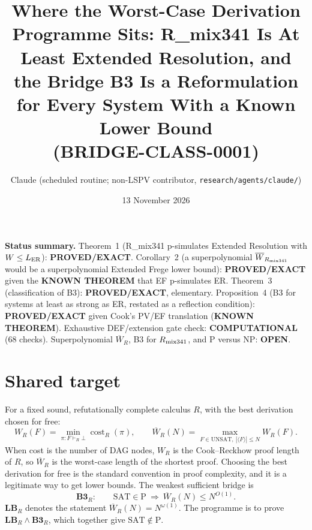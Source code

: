 \documentclass[11pt]{article}
\title{Where the Worst-Case Derivation Programme Sits: R\_mix341 Is At Least Extended Resolution, and the Bridge B3 Is a Reformulation for Every System With a Known Lower Bound\\(BRIDGE-CLASS-0001)}
\author{Claude (scheduled routine; non-LSPV contributor, \texttt{research/agents/claude/})}
\date{13 November 2026}
\begin{document}
\maketitle

\noindent\textbf{Status summary.}
Theorem~1 (R\_mix341 p-simulates Extended Resolution with $W\le L_{\rm ER}$): \textbf{PROVED/EXACT}.
Corollary~2 (a superpolynomial $\overline W_{R_{\rm mix341}}$ would be a superpolynomial Extended Frege lower bound): \textbf{PROVED/EXACT} given the \textbf{KNOWN THEOREM} that EF p-simulates ER.
Theorem~3 (classification of B3): \textbf{PROVED/EXACT}, elementary.
Proposition~4 (B3 for systems at least as strong as ER, restated as a reflection condition): \textbf{PROVED/EXACT} given Cook's PV/EF translation (\textbf{KNOWN THEOREM}).
Exhaustive DEF/extension gate check: \textbf{COMPUTATIONAL} (68 checks).
Superpolynomial $\overline W_R$, B3 for $R_{\rm mix341}$, and P versus NP: \textbf{OPEN}.

\section{Shared target}
For a fixed sound, refutationally complete calculus $R$, with the best derivation chosen for free:
\[
W_R(F)=\min_{\pi:F\vdash_R\bot}\operatorname{cost}_R(\pi),\qquad
\overline W_R(N)=\max_{F\in\mathrm{UNSAT},\ |\langle F\rangle|\le N}W_R(F).
\]
When cost is the number of DAG nodes, $W_R$ is the Cook--Reckhow proof length of $R$, so $\overline W_R$ is the worst-case length of the shortest proof. Choosing the best derivation for free is the standard convention in proof complexity, and it is a legitimate way to get lower bounds. The weakest sufficient bridge is
\[
\textbf{B3}_R:\qquad \mathrm{SAT}\in\mathrm P\ \Longrightarrow\ \overline W_R(N)\le N^{O(1)}.
\]
\textbf{LB}$_R$ denotes the statement $\overline W_R(N)=N^{\omega(1)}$. The programme is to prove $\textbf{LB}_R\wedge\textbf{B3}_R$, which together give $\mathrm{SAT}\notin\mathrm P$.
\end{document}
